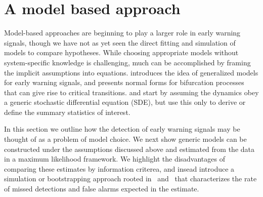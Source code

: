 \documentclass[authoryear,review,11pt]{elsarticle}
\begin{document}
\section{A model based approach}
Model-based approaches are beginning to play a larger role in early warning signals, 
though we have not as yet seen the direct fitting and simulation of models to compare hypotheses.  
While choosing appropriate models without system-specific knowledge is challenging, 
much can be accomplished by framing the implicit assumptions into equations.
\citet{Lade2011} introduces the idea of generalized models for early warning signals, and 
\citet{Kuehn2011} presents normal forms for bifurcation processes that can give rise to critical transitions.  
\citet{Carpenter2011e} and \citet{Dakos2011a} start by assuming the dynamics obey a generic
stochastic differential equation (SDE), but use this only to derive or define the summary statistics of interest.  

In this section we outline how the detection of early warning signals may be thought of
as a problem of model choice.
We next show generic models can be constructed under the assumptions discussed above
and estimated from the data in a maximum likelihood framework.
We highlight the disadvantages of comparing these estimates by information criterea, 
and insead introduce a simulation or bootstrapping approach rooted in~\citet{Cox1961} and~\citet{McLachlan1987} that
characterizes the rate of missed detections and false alarms expected in the estimate. 
\end{document}
